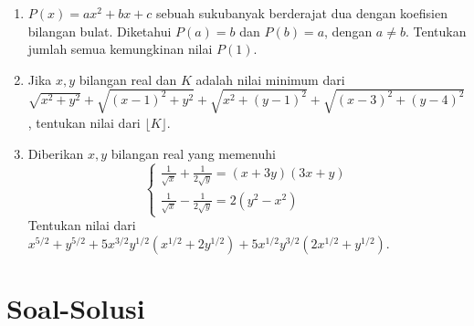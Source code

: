 \documentclass[12pt]{scrartcl}
\begin{document}
\begin{enumerate}
    \item $P(x)=ax^2+bx+c$ sebuah sukubanyak berderajat dua dengan koefisien bilangan bulat. Diketahui $P(a)=b$ dan $P(b)=a$, dengan $a \ne b$. Tentukan jumlah semua kemungkinan nilai $P(1)$.
    
    \item Jika $x, y$ bilangan real dan $K$ adalah nilai minimum dari $\sqrt{x^2+y^2}+\sqrt{(x-1)^2+y^2}+\sqrt{x^2+(y-1)^2}+\sqrt{(x-3)^2+(y-4)^2}$, tentukan nilai dari $\lfloor K \rfloor$.
    
    \item Diberikan $x, y$ bilangan real yang memenuhi
    \[ \begin{cases}
        \frac{1}{\sqrt{x}}+\frac{1}{2\sqrt{y}}=(x+3y)(3x+y) \\
        \frac{1}{\sqrt{x}}-\frac{1}{2\sqrt{y}}=2(y^2-x^2)
    \end{cases} \]
    Tentukan nilai dari $x^{5/2}+y^{5/2}+5x^{3/2}y^{1/2}(x^{1/2}+2y^{1/2})+5x^{1/2}y^{3/2}(2x^{1/2}+y^{1/2})$.
\end{enumerate}

\newpage

\section*{Soal-Solusi}
\end{document}
